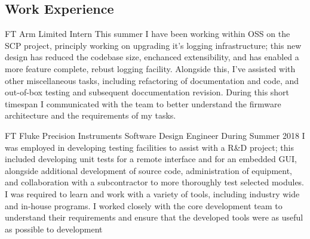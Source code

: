 \documentclass[10pt]{article} %
\begin{document}
\begin{paracol}{2}
\medskip %


\section{Work Experience}




{FT} %
{Arm Limited} %
{Intern} %
{This summer I have been working within OSS on the SCP project, principly working on upgrading it's logging infrastructure; this new design has reduced the codebase size, enchanced extensibility, and has enabled a more feature complete, rebust logging facility. Alongside this, I've assisted with other miscellaneous tasks, including refactoring of documentation and code, and out-of-box testing and subsequent doccumentation revision. During this short timespan I communicated with the team to better understand the firmware architecture and the requirements of my tasks.} %

{FT} %
{Fluke Precision Instruments} %
{Software Design Engineer} %
{During Summer 2018 I was employed in developing testing facilities to assist with a R\&D project; this included developing unit tests for a remote interface and for an embedded GUI, alongside additional development of source code, administration of equipment, and collaboration with a subcontractor to more thoroughly test selected modules. I was required to learn and work with a variety of tools, including industry wide and in-house programs. I worked closely with the core development team to understand their requirements and ensure that the developed tools were as useful as possible to development } %



\end{paracol}
\end{document}
